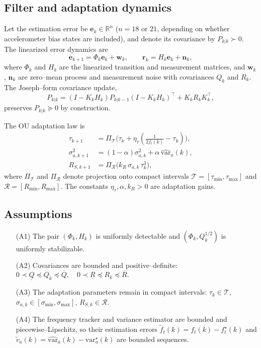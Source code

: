 \documentclass[10pt]{extarticle}
\begin{document}
\subsection{Filter and adaptation dynamics}

Let the estimation error be $\boldsymbol{e}_k \in \mathbb{R}^n$
($n = 18$ or $21$, depending on whether accelerometer bias states are included),
and denote its covariance by $P_{k|k} \succ 0$.
The linearized error dynamics are
\begin{equation}
\boldsymbol{e}_{k+1} = \Phi_k \boldsymbol{e}_k + \boldsymbol{w}_k,\qquad
\boldsymbol{r}_k = H_k \boldsymbol{e}_k + \boldsymbol{n}_k,
\label{eq:error_system}
\end{equation}
where $\Phi_k$ and $H_k$ are the linearized transition and measurement matrices,
and $\boldsymbol{w}_k$, $\boldsymbol{n}_k$ are zero–mean process and measurement noise
with covariances $Q_k$ and $R_k$.
The Joseph–form covariance update,
\begin{equation}
P_{k|k} = (I - K_k H_k) P_{k|k-1} (I - K_k H_k)^{\!\top} + K_k R_k K_k^{\!\top},
\label{eq:joseph_update}
\end{equation}
preserves $P_{k|k} \succeq 0$ by construction.

The OU adaptation law is
\begin{align}
\tau_{k+1} &= \Pi_{\mathcal T}\!\bigl(\tau_k + \eta_\tau (\tfrac{1}{2 f_t(k)} - \tau_k)\bigr),
\label{eq:tau_update}\\
\sigma_{a,k+1}^2 &= (1 - \alpha)\sigma_{a,k}^2 + \alpha\,\widehat{\mathrm{var}}_a(k),
\label{eq:sigma_update}\\
R_{S,k+1} &= \Pi_{\mathcal R}\!\bigl(k_R\,\sigma_{a,k}\,\tau_k^3\bigr),
\label{eq:RS_update}
\end{align}
where $\Pi_{\mathcal T}$ and $\Pi_{\mathcal R}$ denote projection onto compact intervals
$\mathcal{T} = [\tau_{\min}, \tau_{\max}]$ and $\mathcal{R} = [R_{\min}, R_{\max}]$.
The constants $\eta_\tau,\alpha,k_R > 0$ are adaptation gains.

\subsection{Assumptions}

\begin{enumerate}
\item[(A1)] The pair $(\Phi_k,H_k)$ is uniformly detectable and $(\Phi_k,Q_k^{1/2})$
is uniformly stabilizable.
\item[(A2)] Covariances are bounded and positive–definite:
\(
0 \prec \underline{Q} \preceq Q_k \preceq \overline{Q},\quad
0 \prec \underline{R} \preceq R_k \preceq \overline{R}.
\)
\item[(A3)] The adaptation parameters remain in compact intervals:
$\tau_k \in \mathcal T$, $\sigma_{a,k} \in [\sigma_{\min},\sigma_{\max}]$,
$R_{S,k} \in \mathcal R$.
\item[(A4)] The frequency tracker and variance estimator are bounded and
piecewise–Lipschitz, so their estimation errors
$\tilde f_t(k) = f_t(k) - f_t^\star(k)$ and
$\tilde v_a(k) = \widehat{\mathrm{var}}_a(k) - \mathrm{var}_a^\star(k)$
are bounded sequences.
\end{enumerate}
\end{document}
